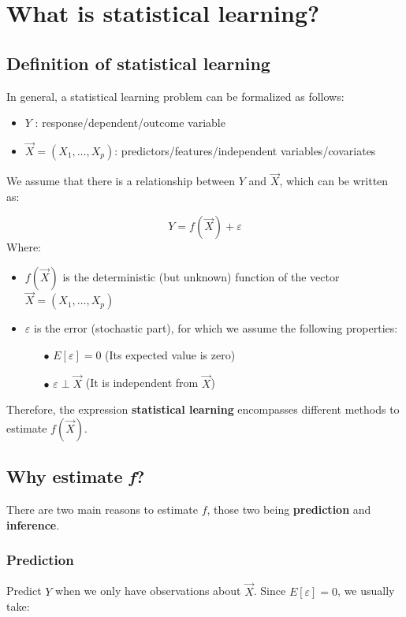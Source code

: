 \chapter{What is statistical learning?}
  
  \section{Definition of statistical learning}
    In general, a statistical learning problem can be formalized as follows:

    \begin{itemize}
      \item $Y$ : response/dependent/outcome variable
      \item $\vec{X} = (X_1, \dots, X_p)$: predictors/features/independent variables/covariates
    \end{itemize}
    We assume that there is a relationship between $Y$ and $\vec{X}$, which can be written as:

    $$Y = f(\vec{X}) + \varepsilon $$
    Where:
    \begin{itemize}
      \item $f(\vec{X})$ is the deterministic (but unknown) function of the vector $\vec{X} = (X_1, \dots, X_p)$
      \item $\varepsilon$ is the error (stochastic part), for which we assume the following properties:
      \begin{itemize}
        \item[$\bullet$] $E[\varepsilon] = 0$ (Its expected value is zero)
        \item[$\bullet$] $\varepsilon \perp \vec{X}$ (It is independent from $\vec{X}$)
      \end{itemize}
    \end{itemize}
    Therefore, the expression \textbf{statistical learning} encompasses different methods to estimate $f(\vec{X})$.

  \section{Why estimate \textit{f}?}
    There are two main reasons to estimate $f$, those two being \textbf{prediction} and \textbf{inference}.
  
    \subsection{Prediction}
      Predict $Y$ when we only have observations about $\vec{X}$. Since $E[\varepsilon] = 0$, we usually take:

